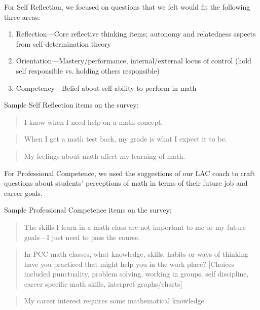 \begin{description}
	      For Self Reflection, we focused on questions that we felt would fit the following three areas:
	      \begin{enumerate}
		      \item Reflection---Core reflective thinking items; autonomy and relatedness aspects from self-determination theory
		      \item Orientation---Mastery/performance, internal/external locus of control (hold self responsible vs.
		            holding others responsible)
		      \item Competency---Belief about self-ability to perform in math
	      \end{enumerate}
	      Sample Self Reflection items on the survey:
	      \begin{quote}
		      I know when I need help on a math concept.
	      \end{quote}
	      \begin{quote}
		      When I get a math test back, my grade is what I expect it to be.
	      \end{quote}
	      \begin{quote}
		      My feelings about math affect my learning of math.
	      \end{quote}

	      For Professional Competence, we used the suggestions of our LAC coach to craft questions about students' perceptions of math in terms of their future job and career goals.

	      Sample Professional Competence items on the survey:
	      \begin{quote}
		      The skills I learn in a math class are not important to me or my future goals---I just need to pass the course.
	      \end{quote}
	      \begin{quote}
		      In PCC math classes, what knowledge, skills, habits or ways of thinking have you practiced that might help you in the work place?
		      [Choices included punctuality,
		      problem solving, working in groups, self discipline, career specific math
		      skills, interpret graphs/charts]
	      \end{quote}
	      \begin{quote}
		      My career interest requires some mathematical knowledge.
	      \end{quote}

	\item[2012/13:  Critical Thinking \& Problem Solving and Professional Competence]


\end{description}
